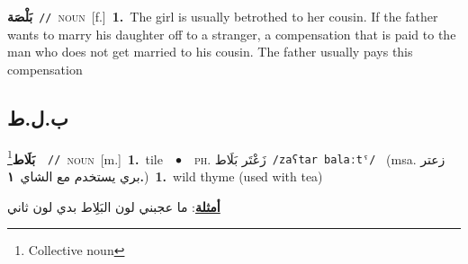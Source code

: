 \documentclass[10pt,a4paper,twoside]{article} %
\begin{document}
\begin{multicols}{2}
{\setlength\topsep{0pt}\textbf{\foreignlanguage{arabic}{بَلْصَة}}\ {\color{gray}\texttt{//}\color{black}}\ \textsc{noun}\ [f.]\ \textbf{1.}~The girl is usually betrothed to her cousin. If the father wants to marry his daughter off to a stranger, a compensation that is paid to the man who does not get married to his cousin. The father usually pays this compensation\ } \vspace{2mm}

\vspace{-3mm}
\subsection*{\color{blue}\foreignlanguage{arabic}{ب.ل.ط}\color{blue}{}} 

{\setlength\topsep{0pt}\textbf{\foreignlanguage{arabic}{بَلَاط}}\footnote{Collective noun}\ \ {\color{gray}\texttt{//}\color{black}}\ \textsc{noun}\ [m.]\ \textbf{1.}~tile\ \ $\bullet$\ \ \textsc{ph.} \color{gray} \foreignlanguage{arabic}{زَعْتَر بَلَاط}\color{black}\ {\color{gray}\texttt{/{\sffamily zaʕtar balaːtˤ}/}\color{black}}\ \color{gray} (msa. \foreignlanguage{arabic}{زعتر بري يستخدم مع الشاي}~\foreignlanguage{arabic}{\textbf{١.}})\color{black}\ \textbf{1.}~wild thyme (used with tea)\  \begin{flushright}\color{gray}\foreignlanguage{arabic}{\textbf{\underline{\foreignlanguage{arabic}{أمثلة}}}: ما عجبني لون البَلِاط بدي لون ثاني}\end{flushright}\color{black}} \vspace{2mm}


\end{multicols}
\end{document}
